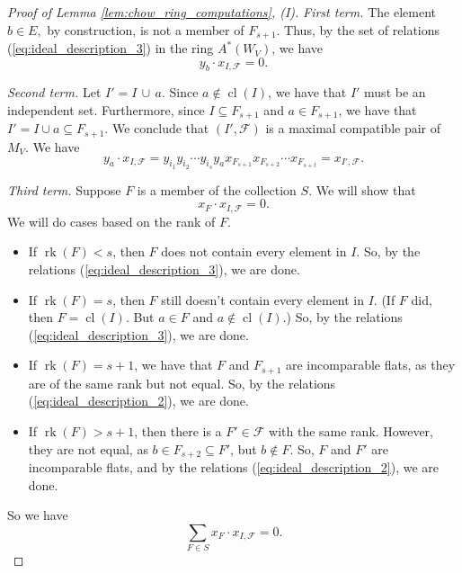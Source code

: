 \documentclass{amsart}
\theoremstyle{plain}
\theoremstyle{definition}
\newcommand{\rk}{\operatorname{rk}}
\newcommand{\cl}{\operatorname{cl}}
\begin{document}
\begin{proof}[Proof of Lemma \ref{lem:chow_ring_computations}, (I)]
\noindent
\textit{First term.} The element $b\in E,$ by construction, is not a member of $F_{s+1}$. Thus, by the set of relations (\ref{eq:ideal_description_3}) in the ring $A^*(W_V)$, we have
\begin{equation*}
y_b \cdot x_{I, \mathscr{F}} = 0.
\end{equation*}

\noindent
\textit{Second term.} Let $I' = I \, \cup \, a$. Since $a \notin \cl(I)$, we have that $I'$ must be an independent set. Furthermore, since $I \subseteq F_{s+1}$ and $a \in F_{s+1}$, we have that $I' = I \cup a \subseteq F_{s+1}$. We conclude that $(I', \mathscr{F})$ is a maximal compatible pair of $M_V$. We have
\begin{equation*}
y_a \cdot x_{I, \mathscr{F}} = y_{i_1}y_{i_2}\cdots y_{i_s} y_{a} x_{F_{s+1}}x_{F_{s+2}}\cdots x_{F_{s+t}} = x_{I',\mathscr{F}}. 
\end{equation*}

\noindent
\textit{Third term.} Suppose $F$ is a member of the collection $S$. We will show that \[x_F \cdot x_{I , \mathscr{F}} = 0.\]
We will do cases based on the rank of $F$.
\begin{itemize}

\item If $\rk(F) < s$, then $F$ does not contain every element in $I$. So, by the relations (\ref{eq:ideal_description_3}), we are done.

\item If $\rk(F) = s$, then $F$ still doesn't contain every element in $I$. (If $F$ did, then $F = \cl(I)$. But $a\in F$ and $a \notin \cl(I)$.) So, by the relations (\ref{eq:ideal_description_3}), we are done.

\item If $\rk(F) = s+1$, we have that $F$ and $F_{s+1}$ are incomparable flats, as they are of the same rank but not equal. So, by the relations (\ref{eq:ideal_description_2}), we are done.

\item If $\rk(F) > s+1$, then there is a $F' \in \mathscr{F}$ with the same rank. However, they are not equal, as $b\in F_{s+2} \subseteq F'$, but $b \notin F$. So, $F$ and $F'$ are incomparable flats, and by the relations (\ref{eq:ideal_description_2}), we are done.
\end{itemize}
So we have
\begin{equation*}
\sum_{F \in S}x_F \cdot x_{I,\mathscr{F}} = 0.
\end{equation*}


\end{proof}
\end{document}
